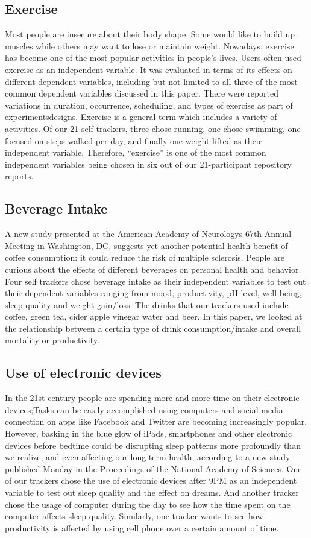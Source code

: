 \subsection{Exercise}
Most people are insecure about their body shape. Some would like to build up muscles while others may want to lose or maintain weight. Nowadays, exercise has become one of the most popular activities in people's lives. Users often used exercise as an independent variable. It was evaluated in terms of its effects on different dependent variables, including but not limited to all three of the most common dependent variables discussed in this paper. There were reported variations in duration, occurrence, scheduling, and types of exercise as part of experiments\textquotesingle  designs. Exercise is a general term which includes a variety of activities. Of our 21 self trackers, three chose running, one chose swimming, one focused on steps walked per day, and finally one weight lifted as their independent variable. Therefore, \enquote{exercise} is one of the most common independent variables being chosen in six out of our 21-participant repository reports.
 
\subsection{Beverage Intake}
A new study presented at the American Academy of Neurology\textquotesingle s 67th Annual Meeting in Washington, DC, suggests yet another potential health benefit of coffee consumption: it could reduce the risk of multiple sclerosis. People are curious about the effects of different beverages on personal health and behavior. Four self trackers chose beverage intake as their independent variables to test out their dependent variables ranging from mood, productivity, pH level, well being, sleep quality and weight gain/loss. The drinks that our trackers used include coffee, green tea, cider apple vinegar water and beer. In this paper, we looked at the relationship between a certain type of drink consumption/intake and overall mortality or productivity.
 
\subsection{Use of electronic devices}
In the 21st century people are spending more and more time on their electronic devices;Tasks can be easily accomplished using computers and social media connection on apps like Facebook and Twitter are becoming increasingly popular. However, basking in the blue glow of iPads, smartphones and other electronic devices before bedtime could be disrupting sleep patterns more profoundly than we realize, and even affecting our long-term health, according to a new study published Monday in the Proceedings of the National Academy of Sciences. One of our trackers chose the use of electronic devices after 9PM as an independent variable to test out sleep quality and the effect on dreams. And another tracker chose the usage of computer during the day to see how the time spent on the computer affects sleep quality. Similarly, one tracker wants to see how productivity is affected by using cell phone over a certain amount of time.
 

